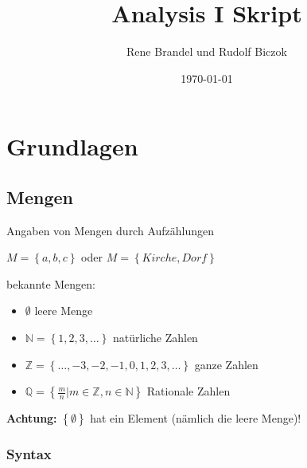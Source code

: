 \documentclass[fleqn]{scrbook}
\newcommand{\titleText}{Analysis I Skript}
\newcommand{\mainAuthor}{Rene Brandel und Rudolf Biczok}
\begin{document}
\title{\titleText}
\date{\today}
\author{\mainAuthor}
\maketitle

\newpage
\tableofcontents
\newpage

\chapter{Grundlagen}

\section{Mengen}

Angaben von Mengen durch Aufzählungen

$M=\left\{ a,b,c \right\}$ oder $M=\left\{ Kirche, Dorf\right\}$

bekannte Mengen:
\begin{itemize}
  \item $\emptyset$ leere Menge
  \item $\mathbb{N} = \left\{ 1,2,3,\ldots \right\}$ natürliche Zahlen
  \item $\mathbb{Z} = \left\{ \ldots,-3,-2,-1,0,1,2,3,\ldots \right\}$ ganze Zahlen
  \item $\mathbb{Q} = \left\{ \frac{m}{n}|m \in \mathbb{Z},n \in \mathbb{N} \right\}$ Rationale Zahlen
\end{itemize}

\textbf{Achtung:} $\left\{ \emptyset \right\}$ hat ein Element (nämlich die leere Menge)!

\subsection{Syntax}
\end{document}
